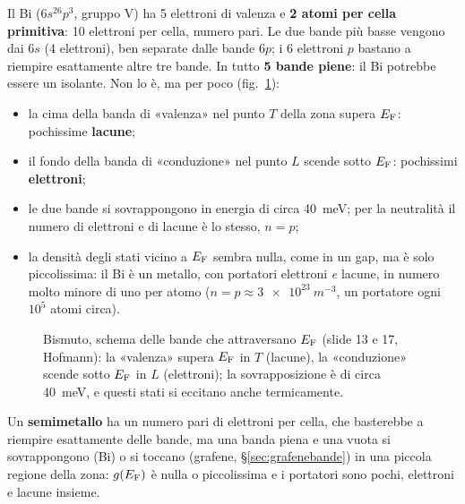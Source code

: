 \documentclass[11pt,a4paper]{article}
\begin{document}
Il Bi ($6s^26p^3$, gruppo V) ha 5 elettroni di valenza e \textbf{2 atomi per cella primitiva}: 10 elettroni per cella, numero pari. Le due bande più
basse vengono dai $6s$ (4 elettroni), ben separate dalle bande $6p$; i 6 elettroni $p$ bastano a riempire esattamente altre tre bande. In tutto
\textbf{5 bande piene}: il Bi potrebbe essere un isolante. Non lo è, ma per poco (fig.~\ref{fig:bismuto}):
\begin{itemize}
\item la cima della banda di «valenza» nel punto $T$ della zona supera $E_{\mathrm F}$: pochissime \textbf{lacune};
\item il fondo della banda di «conduzione» nel punto $L$ scende sotto $E_{\mathrm F}$: pochissimi \textbf{elettroni};
\item le due bande si sovrappongono in energia di circa \SI{40}{meV}; per la neutralità il numero di elettroni e di lacune è lo stesso, $n=p$;
\item la densità degli stati vicino a $E_{\mathrm F}$ sembra nulla, come in un gap, ma è solo piccolissima: il Bi è un metallo, con portatori elettroni
\emph{e} lacune, in numero molto minore di uno per atomo ($n=p\approx\SI{3e23}{m^{-3}}$, un portatore ogni $10^5$ atomi circa).
\end{itemize}

\begin{figure}[tbp]
\centering{}
\caption{Bismuto, schema delle bande che attraversano $E_{\mathrm F}$ (slide 13 e 17, Hofmann): la «valenza» supera $E_{\mathrm F}$ in $T$ (lacune), la «conduzione»
scende sotto $E_{\mathrm F}$ in $L$ (elettroni); la sovrapposizione è di circa \SI{40}{meV}, e questi stati si eccitano anche termicamente.}\label{fig:bismuto}
\end{figure}

\begin{definizione}[semimetallo]
Un \textbf{semimetallo}  ha un numero pari di elettroni per cella, che basterebbe a riempire esattamente delle bande, ma una banda
piena e una vuota si sovrappongono (Bi) o si toccano (grafene, §\ref{sec:grafenebande}) in una piccola regione della zona: $g(E_{\mathrm F})$ è nulla o
piccolissima e i portatori sono pochi, elettroni e lacune insieme.
\end{definizione}
\end{document}
